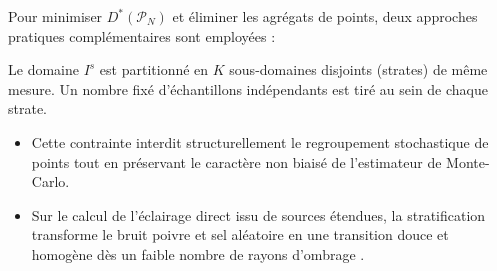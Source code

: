 Pour minimiser $D^*(\mathcal{P}_N)$ et éliminer les agrégats de points, deux approches pratiques complémentaires sont employées :

\begin{proposition}
    Le domaine $I^s$ est partitionné en $K$ sous-domaines disjoints (strates) de même mesure. Un nombre fixé d'échantillons indépendants est tiré au sein de chaque strate. 
    \begin{itemize}
        \item Cette contrainte interdit structurellement le regroupement stochastique de points tout en préservant le caractère non biaisé de l'estimateur de Monte-Carlo.
        \item Sur le calcul de l'éclairage direct issu de sources étendues, la stratification transforme le bruit poivre et sel aléatoire en une transition douce et homogène dès un faible nombre de rayons d'ombrage .
    \end{itemize}
\end{proposition}

